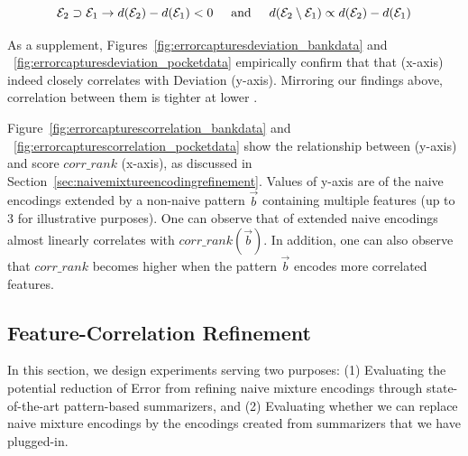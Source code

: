 {\small
$$\mathcal E_2\supset \mathcal E_1\to d(\mathcal E_2)-d(\mathcal E_1)<0\hspace{5mm}\text{and}\hspace{5mm}d(\mathcal E_2\setminus \mathcal E_1)\propto d(\mathcal E_2)-d(\mathcal E_1)$$ 
}\vspace*{-5mm}

As a supplement, Figures~\ref{fig:errorcapturesdeviation_bankdata} and ~\ref{fig:errorcapturesdeviation_pocketdata} empirically confirm that that \errorname (x-axis) indeed closely correlates with Deviation (y-axis).
Mirroring our findings above, correlation between them is tighter at lower \errorname.


Figure~\ref{fig:errorcapturescorrelation_bankdata} and ~\ref{fig:errorcapturescorrelation_pocketdata} show the relationship between \errorname (y-axis) and score $corr\_rank$ (x-axis), as discussed in Section~\ref{sec:naivemixtureencodingrefinement}. Values of y-axis are \errorname of the naive encodings extended by a non-naive pattern $\vec{b}$ containing multiple features (up to 3 for illustrative purposes). 
One can observe that \errorname of extended naive encodings almost linearly correlates with $corr\_rank(\vec b)$. 
In addition, one can also observe that $corr\_rank$ becomes higher when the pattern $\vec{b}$ encodes more correlated features. 

\subsection{Feature-Correlation Refinement}
\label{sec:motivatepatternmixturesummaries}
In this section, we design experiments serving two purposes: (1) Evaluating the potential reduction of Error from refining naive mixture encodings through state-of-the-art pattern-based summarizers, and (2) Evaluating whether we can replace naive mixture encodings by the encodings created from summarizers that we have plugged-in.


